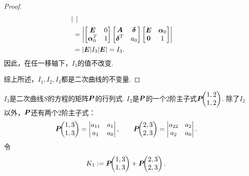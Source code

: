 \begin{theorem}
\begin{proof}
\begin{align*}
\begin{vmatrix}
	\end{vmatrix} \\
	&= \abs{
		\begin{bmatrix}
			\boldsymbol{E} & 0 \\
			\boldsymbol\alpha_0^T & 1
		\end{bmatrix}
		\begin{bmatrix}
			\boldsymbol{A} & \boldsymbol\delta \\
			\boldsymbol\delta^T & a_0
		\end{bmatrix}
		\begin{bmatrix}
			\boldsymbol{E} & \boldsymbol\alpha_0 \\
			\boldsymbol0 & 1
		\end{bmatrix}
	} \\
	&= \abs{\boldsymbol{E}} I_3 \abs{\boldsymbol{E}}
	= I_3.
\end{align*}
因此，在任一移轴下，\(I_3\)的值不改变.

综上所述，\(I_1,I_2,I_3\)都是二次曲线的不变量.
\end{proof}
\end{theorem}

\(I_3\)是二次曲线\(S\)的方程的矩阵\(\boldsymbol{P}\)的行列式.
\(I_2\)是\(\boldsymbol{P}\)的一个2阶主子式\(\boldsymbol{P}\kern-3.8pt\begin{pmatrix}1,2 \\ 1,2\end{pmatrix}\).
除了\(I_2\)以外，\(\boldsymbol{P}\)还有两个2阶主子式：\begin{equation*}
	\boldsymbol{P}\kern-3.8pt\begin{pmatrix}1,3 \\ 1,3\end{pmatrix}
	= \begin{vmatrix}
		a_{11} & a_1 \\
		a_1 & a_0
	\end{vmatrix},
	\qquad
	\boldsymbol{P}\kern-3.8pt\begin{pmatrix}2,3 \\ 2,3\end{pmatrix}
	= \begin{vmatrix}
		a_{22} & a_2 \\
		a_2 & a_0
	\end{vmatrix}.
\end{equation*}
令\begin{equation*}
	K_1 := \boldsymbol{P}\kern-3.8pt\begin{pmatrix}1,3 \\ 1,3\end{pmatrix} + \boldsymbol{P}\kern-3.8pt\begin{pmatrix}2,3 \\ 2,3\end{pmatrix}.
\end{equation*}

